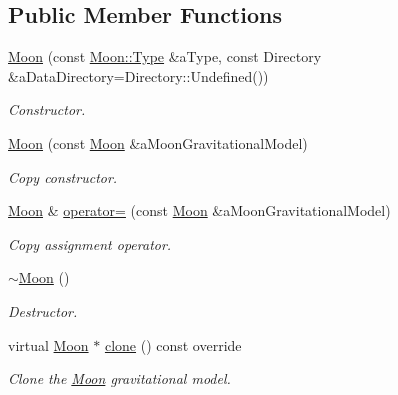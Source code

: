 \subsection*{Public Member Functions}
\begin{DoxyCompactItemize}
\item 
\hyperlink{classostk_1_1physics_1_1environment_1_1gravitational_1_1_moon_a3efd035ca7e61e851a930580ff73bb84}{Moon} (const \hyperlink{classostk_1_1physics_1_1environment_1_1gravitational_1_1_moon_a09ec881799f85fdef3547ef443d57c27}{Moon\+::\+Type} \&a\+Type, const Directory \&a\+Data\+Directory=Directory\+::\+Undefined())
\begin{DoxyCompactList}\small\item\em Constructor. \end{DoxyCompactList}\item 
\hyperlink{classostk_1_1physics_1_1environment_1_1gravitational_1_1_moon_a9309d4ba7336268d4d173632ff1bf18d}{Moon} (const \hyperlink{classostk_1_1physics_1_1environment_1_1gravitational_1_1_moon}{Moon} \&a\+Moon\+Gravitational\+Model)
\begin{DoxyCompactList}\small\item\em Copy constructor. \end{DoxyCompactList}\item 
\hyperlink{classostk_1_1physics_1_1environment_1_1gravitational_1_1_moon}{Moon} \& \hyperlink{classostk_1_1physics_1_1environment_1_1gravitational_1_1_moon_a26226ccd5a99dd7826cc38ff3d023afc}{operator=} (const \hyperlink{classostk_1_1physics_1_1environment_1_1gravitational_1_1_moon}{Moon} \&a\+Moon\+Gravitational\+Model)
\begin{DoxyCompactList}\small\item\em Copy assignment operator. \end{DoxyCompactList}\item 
\hyperlink{classostk_1_1physics_1_1environment_1_1gravitational_1_1_moon_aa315790d15e586d7614f2abd630f00e7}{$\sim$\+Moon} ()
\begin{DoxyCompactList}\small\item\em Destructor. \end{DoxyCompactList}\item 
virtual \hyperlink{classostk_1_1physics_1_1environment_1_1gravitational_1_1_moon}{Moon} $\ast$ \hyperlink{classostk_1_1physics_1_1environment_1_1gravitational_1_1_moon_a264078001de13a1f35297a87a7c3abec}{clone} () const override
\begin{DoxyCompactList}\small\item\em Clone the \hyperlink{classostk_1_1physics_1_1environment_1_1gravitational_1_1_moon}{Moon} gravitational model. \end{DoxyCompactList}\item 

\end{DoxyCompactItemize}
